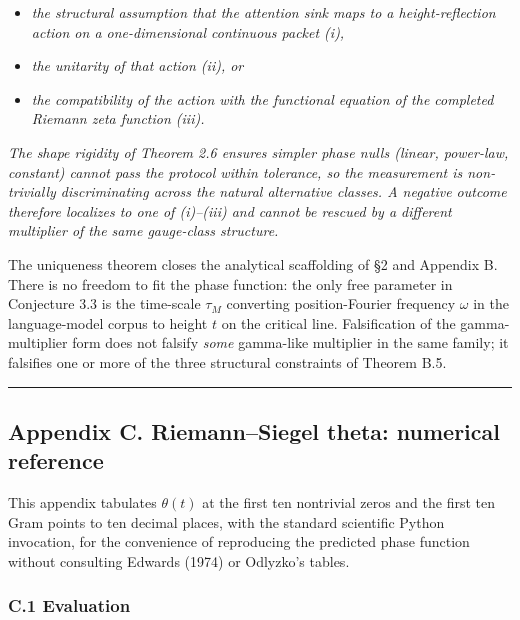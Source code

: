 \documentclass[
  letterpaper,
  11pt]{article}
\providecommand{\tightlist}{%
  \setlength{\itemsep}{0pt}\setlength{\parskip}{0pt}}
\theoremstyle{plain}
\theoremstyle{definition}
\theoremstyle{remark}
\begin{document}
\begin{itemize}
\tightlist
\item
  \emph{the structural assumption that the attention sink maps to a height-reflection action on a one-dimensional continuous packet (i),}
\item
  \emph{the unitarity of that action (ii), or}
\item
  \emph{the compatibility of the action with the functional equation of the completed Riemann zeta function (iii).}
\end{itemize}

\emph{The shape rigidity of Theorem 2.6 ensures simpler phase nulls (linear, power-law, constant) cannot pass the protocol within tolerance, so the measurement is non-trivially discriminating across the natural alternative classes. A negative outcome therefore localizes to one of (i)--(iii) and cannot be rescued by a different multiplier of the same gauge-class structure.}

The uniqueness theorem closes the analytical scaffolding of §2 and Appendix B. There is no freedom to fit the phase function: the only free parameter in Conjecture 3.3 is the time-scale \(\tau_M\) converting position-Fourier frequency \(\omega\) in the language-model corpus to height \(t\) on the critical line. Falsification of the gamma-multiplier form does not falsify \emph{some} gamma-like multiplier in the same family; it falsifies one or more of the three structural constraints of Theorem B.5.

\begin{center}\rule{0.5\linewidth}{0.5pt}\end{center}

\subsection{Appendix C. Riemann--Siegel theta: numerical reference}\label{appendix-c.-riemannsiegel-theta-numerical-reference}

This appendix tabulates \(\theta(t)\) at the first ten nontrivial zeros and the first ten Gram points to ten decimal places, with the standard scientific Python invocation, for the convenience of reproducing the predicted phase function without consulting Edwards (1974) or Odlyzko's tables.

\subsubsection{C.1 Evaluation}\label{c.1-evaluation}
\end{document}
